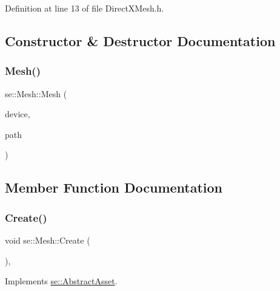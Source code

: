 Definition at line 13 of file Direct\+X\+Mesh.\+h.



\subsection{Constructor \& Destructor Documentation}
\mbox{\label{classse_1_1_mesh_a0427ddfbf15bff6b16a703e179e8265d}} 
\subsubsection{\texorpdfstring{Mesh()}{Mesh()}}
{\footnotesize\ttfamily se\+::\+Mesh\+::\+Mesh (\begin{DoxyParamCaption}\item[{L\+P\+D\+I\+R\+E\+C\+T3\+D\+D\+E\+V\+I\+C\+E9}]{device,  }\item[{const std\+::string \&}]{path }\end{DoxyParamCaption})}



\subsection{Member Function Documentation}
\mbox{\label{classse_1_1_mesh_a56e2d07f7b642c16e89631796a0d576e}} 
\subsubsection{\texorpdfstring{Create()}{Create()}}
{\footnotesize\ttfamily void se\+::\+Mesh\+::\+Create (\begin{DoxyParamCaption}{ }\end{DoxyParamCaption})\hspace{0.3cm}{\ttfamily [override]}, {\ttfamily [virtual]}}



Implements \mbox{\hyperlink{classse_1_1_abstract_asset_ae3f9fb8f5c26ac8ea511e8e21f5bd624}{se\+::\+Abstract\+Asset}}.

\mbox{\label{classse_1_1_mesh_a17116983a6c6e73770585b72332c5140}} 

